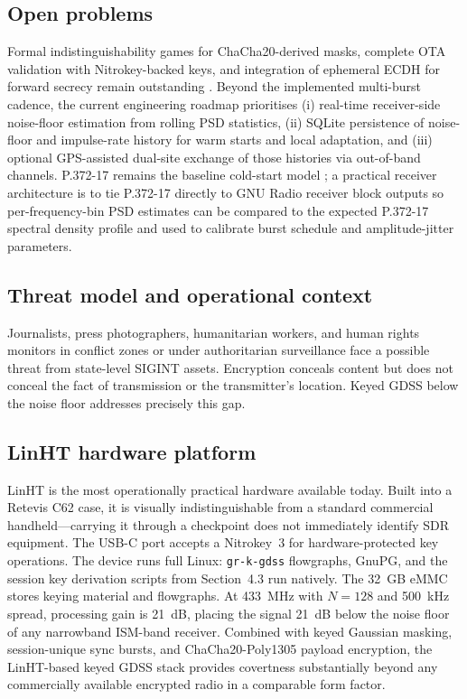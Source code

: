 \documentclass[10pt,a4paper,twocolumn]{article}
\begin{document}
\subsection{Open problems}
Formal indistinguishability games for ChaCha20-derived masks, complete OTA validation with Nitrokey-backed keys, and integration of ephemeral ECDH for forward secrecy remain outstanding \cite{repo_gdss}. Beyond the implemented multi-burst cadence, the current engineering roadmap prioritises (i) real-time receiver-side noise-floor estimation from rolling PSD statistics, (ii) SQLite persistence of noise-floor and impulse-rate history for warm starts and local adaptation, and (iii) optional GPS-assisted dual-site exchange of those histories via out-of-band channels. P.372-17 remains the baseline cold-start model \cite{p372}; a practical receiver architecture is to tie P.372-17 directly to GNU Radio receiver block outputs so per-frequency-bin PSD estimates can be compared to the expected P.372-17 spectral density profile and used to calibrate burst schedule and amplitude-jitter parameters.

\subsection{Threat model and operational context}
Journalists, press photographers, humanitarian workers, and human rights monitors in conflict zones or under authoritarian surveillance face a possible threat from state-level SIGINT assets. Encryption conceals content but does not conceal the fact of transmission or the transmitter's location. Keyed GDSS below the noise floor addresses precisely this gap.

\subsection{LinHT hardware platform}
LinHT is the most operationally practical hardware available today. Built into a Retevis C62 case, it is visually indistinguishable from a standard commercial handheld---carrying it through a checkpoint does not immediately identify SDR equipment. The USB-C port accepts a Nitrokey~3 for hardware-protected key operations. The device runs full Linux: \texttt{gr-k-gdss} flowgraphs, GnuPG, and the session key derivation scripts from Section~4.3 run natively. The 32~GB eMMC stores keying material and flowgraphs. At 433~MHz with $N{=}128$ and 500~kHz spread, processing gain is 21~dB, placing the signal 21~dB below the noise floor of any narrowband ISM-band receiver. Combined with keyed Gaussian masking, session-unique sync bursts, and ChaCha20-Poly1305 payload encryption, the LinHT-based keyed GDSS stack provides covertness substantially beyond any commercially available encrypted radio in a comparable form factor.
\end{document}
